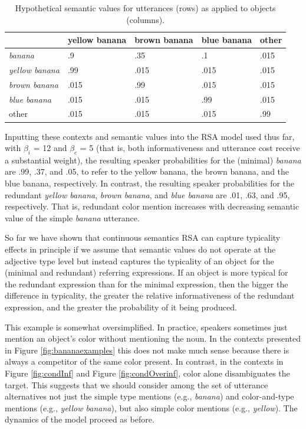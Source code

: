 \documentclass[11pt]{article}
\newcommand{\figref}[1]{Figure \ref{#1}}
\begin{document}
\begin{table}
\centering
\caption{Hypothetical semantic values for utterances (rows) as applied to objects (columns).}
\begin{tabular}{l l l l l}
\toprule
 & yellow banana & brown banana & blue banana & other\\
\midrule
\emph{banana} & .9 & .35 & .1 & .015 \\
\midrule
\emph{yellow banana} & .99 & .015 & .015 & .015 \\
\emph{brown banana} & .015 & .99 & .015 & .015 \\
\emph{blue banana} & .015 & .015 & .99 & .015 \\
\midrule
other & .015 & .015 & .015 & .99 \\
\bottomrule
\end{tabular}
\label{tab:colorobjectfidelities}
\end{table}

Inputting these contexts and semantic values into the RSA model used thus far, with $\beta_i$ = 12 and $\beta_c$ = 5 (that is, both informativeness and utterance cost receive a substantial weight), the resulting speaker probabilities for the (minimal) \emph{banana} are .99, .37, and .05, to refer to the yellow banana, the brown banana, and the blue banana, respectively. In contrast, the resulting speaker probabilities for the redundant \emph{yellow banana}, \emph{brown banana}, and \emph{blue banana} are .01, .63, and .95, respectively. That is, redundant color mention increases with decreasing semantic value of the simple \emph{banana} utterance.

So far we have shown that continuous semantics RSA can capture typicality effects in principle if we assume that semantic values do not operate at the adjective type level but instead captures the typicality of an object for the (minimal and redundant) referring expressions. If an object is more typical for the redundant expression than for the minimal expression, then the bigger the difference in typicality, the greater the relative informativeness of the redundant expression, and the greater the probability of it being produced. 

This example is somewhat oversimplified. In practice, speakers sometimes just mention an object's color without mentioning the noun. In the contexts presented in \figref{fig:bananaexamples} this does not make much sense because there is always a competitor of the same color present. In contrast, in the contexts in \figref{fig:condInf} and \figref{fig:condOverinf}, color alone disambiguates the target. This suggests that we should consider among the set of utterance alternatives not just the simple type mentions (e.g., \emph{banana}) and color-and-type mentions (e.g., \emph{yellow banana}), but also simple color mentions (e.g., \emph{yellow}). The dynamics of the model proceed as before.
\end{document}

